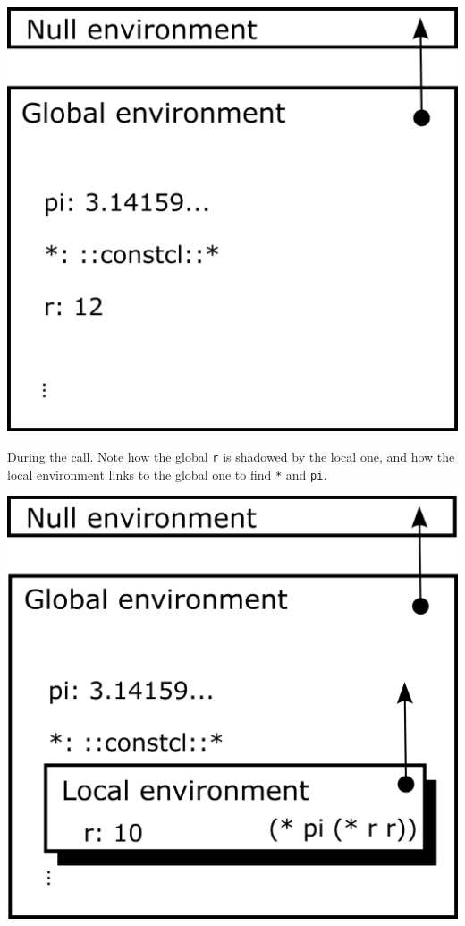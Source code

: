 \documentclass[twoside,9pt]{report}
\begin{document}
\includegraphics{images/env1.png}

During the call. Note how the global \texttt{r} is shadowed by the local one, and how the local environment links to the global one to find \texttt{*} and \texttt{pi}.

\includegraphics{images/env2.png}
\end{document}
